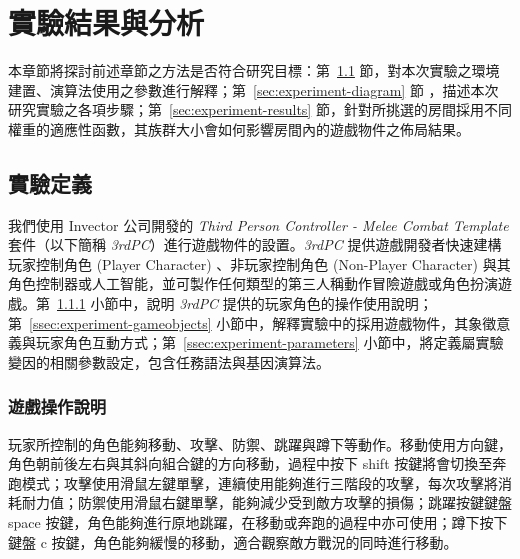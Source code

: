 \newcommand{\garesultstable}[5]{{
\begin{table}[H]
  \centering
  \caption{實驗 #2 - 共 #3 回合的最佳個體之標準化加權適應值}
  \label{tbl:result-of-experiment-#1}
  \bigskip
  \vspace{-5mm}
  \garesultssubtable{#4}
  \garesultssubtable{#5}
\end{table}
}}

\chapter{實驗結果與分析}
\label{cha:experiment}

本章節將探討前述章節之方法是否符合研究目標：第~\ref{sec:experiment-definition} 節，對本次實驗之環境建置、演算法使用之參數進行解釋；第~\ref{sec:experiment-diagram} 節
，描述本次研究實驗之各項步驟；第~\ref{sec:experiment-results} 節，針對所挑選的房間採用不同權重的適應性函數，其族群大小會如何影響房間內的遊戲物件之佈局結果。

\section{實驗定義}
\label{sec:experiment-definition}

我們使用 Invector 公司開發的 \textit{Third Person Controller - Melee Combat Template} 套件（以下簡稱 \textit{3rdPC}）進行遊戲物件的設置。\textit{3rdPC} 提供遊戲開發者快速建構玩家控制角色 (Player Character) 、非玩家控制角色 (Non-Player Character) 與其角色控制器或人工智能，並可製作任何類型的第三人稱動作冒險遊戲或角色扮演遊戲。第~\ref{ssec:experiment-gameplaymanual} 小節中，說明 \textit{3rdPC} 提供的玩家角色的操作使用說明；第~\ref{ssec:experiment-gameobjects} 小節中，解釋實驗中的採用遊戲物件，其象徵意義與玩家角色互動方式；第~\ref{ssec:experiment-parameters} 小節中，將定義屬實驗變因的相關參數設定，包含任務語法與基因演算法。

\subsection{遊戲操作說明}
\label{ssec:experiment-gameplaymanual}

玩家所控制的角色能夠移動、攻擊、防禦、跳躍與蹲下等動作。移動使用方向鍵，角色朝前後左右與其斜向組合鍵的方向移動，過程中按下 shift 按鍵將會切換至奔跑模式；攻擊使用滑鼠左鍵單擊，連續使用能夠進行三階段的攻擊，每次攻擊將消耗耐力值；防禦使用滑鼠右鍵單擊，能夠減少受到敵方攻擊的損傷；跳躍按鍵鍵盤 space 按鍵，角色能夠進行原地跳躍，在移動或奔跑的過程中亦可使用；蹲下按下鍵盤 c 按鍵，角色能夠緩慢的移動，適合觀察敵方戰況的同時進行移動。

